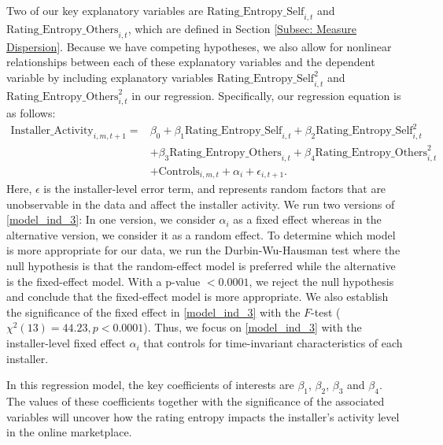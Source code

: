 \documentclass[mnsc,blindrev]{informs3}
\begin{document}
	Two of our key explanatory  variables are $\text{Rating\_Entropy\_Self}_{i,t}$ and  $\text{Rating\_Entropy\_Others}_{i,t}$, which are defined in Section \ref{Subsec: Measure Dispersion}. Because we have competing hypotheses, we also allow for nonlinear relationships between each of these explanatory variables and the dependent variable by including explanatory variables $\text{Rating\_Entropy\_Self}_{i,t}^{2}$ and $\text{Rating\_Entropy\_Others}_{i,t}^{2}$ in our regression. Specifically, our regression equation is as follows:
	\begin{align}  \nonumber
	\text{Installer\_Activity}_{i,m,t+1}=&\beta_{0}+\beta_{1} \text{Rating\_Entropy\_Self}_{i,t}+\beta_{2} \text{Rating\_Entropy\_Self}_{i,t}^ {2}
	\\ \nonumber
	&+\beta_{3} \text{Rating\_Entropy\_Others}_{i,t}  +\beta_{4}\text{Rating\_Entropy\_Others}_{i,t}^{2} \\ \label{model_ind_3}
	&+ \text{Controls}_{i,m,t}+ \alpha_{i} + \epsilon_{i,t+1}.
	\end{align}
	Here, $\epsilon$ is the installer-level error term, and represents random factors that are unobservable in the data and affect the installer activity.  We run two versions of \eqref{model_ind_3}: In one version, we consider $\alpha_{i}$ as a fixed effect whereas in the alternative version, we consider it as a random effect. To determine which model is more appropriate for our data, we run the Durbin-Wu-Hausman test where the null hypothesis is that the random-effect model is preferred while the alternative is the fixed-effect model. With a p-value $<0.0001$, we reject the null hypothesis and conclude that the fixed-effect model is more appropriate. We also establish the significance of the fixed effect in \eqref{model_ind_3} with the $F$-test ($\chi^{2}(13)=44.23, p < 0.0001$). Thus, we focus on \eqref{model_ind_3} with the installer-level fixed effect $\alpha_{i}$ that controls for time-invariant characteristics of each installer.
	
	In this regression model, the key coefficients of interests are $\beta_{1}$, $\beta_{2}$, $\beta_{3}$ and $\beta_{4}$. The values of these coefficients together with the significance of the associated variables will uncover how the rating entropy impacts the installer's activity level in the online marketplace.
	
\end{document}
